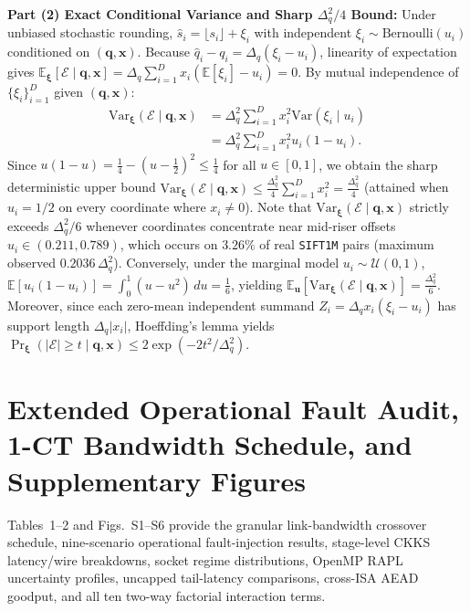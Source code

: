 \documentclass[10pt,journal,compsoc]{IEEEtran}
\begin{document}
\smallskip\noindent\textbf{Part (2) Exact Conditional Variance and Sharp $\Delta_q^2/4$ Bound:} Under unbiased stochastic rounding, $\widehat{s}_i = \lfloor s_i \rfloor + \xi_i$ with independent $\xi_i \sim \mathrm{Bernoulli}(u_i)$ conditioned on $(\mathbf{q},\mathbf{x})$. Because $\widehat{q}_i - q_i = \Delta_q(\xi_i - u_i)$, linearity of expectation gives $\mathbb{E}_{\boldsymbol{\xi}}[\mathcal{E}\mid\mathbf{q},\mathbf{x}] = \Delta_q \sum_{i=1}^D x_i (\mathbb{E}[\xi_i] - u_i) = 0$. By mutual independence of $\{\xi_i\}_{i=1}^D$ given $(\mathbf{q},\mathbf{x})$:
\begin{align}
\mathrm{Var}_{\boldsymbol{\xi}}(\mathcal{E} \mid \mathbf{q}, \mathbf{x}) &= \Delta_q^2 \sum_{i=1}^D x_i^2 \mathrm{Var}(\xi_i \mid u_i) \nonumber\\
&= \Delta_q^2 \sum_{i=1}^D x_i^2 u_i(1 - u_i).
\end{align}
Since $u(1-u) = \frac{1}{4} - (u - \frac{1}{2})^2 \le \frac{1}{4}$ for all $u \in [0,1]$, we obtain the sharp deterministic upper bound $\mathrm{Var}_{\boldsymbol{\xi}}(\mathcal{E}\mid\mathbf{q},\mathbf{x}) \le \frac{\Delta_q^2}{4}\sum_{i=1}^D x_i^2 = \frac{\Delta_q^2}{4}$ (attained when $u_i = 1/2$ on every coordinate where $x_i \neq 0$). Note that $\mathrm{Var}_{\boldsymbol{\xi}}(\mathcal{E}\mid\mathbf{q},\mathbf{x})$ strictly exceeds $\Delta_q^2/6$ whenever coordinates concentrate near mid-riser offsets $u_i \in (0.211, 0.789)$, which occurs on $3.26\%$ of real \texttt{SIFT1M} pairs (maximum observed $0.2036\,\Delta_q^2$). Conversely, under the marginal model $u_i \sim \mathcal{U}(0,1)$, $\mathbb{E}[u_i(1-u_i)] = \int_0^1 (u - u^2)\,du = \frac{1}{6}$, yielding $\mathbb{E}_{\mathbf{u}}[\mathrm{Var}_{\boldsymbol{\xi}}(\mathcal{E}\mid\mathbf{q},\mathbf{x})] = \frac{\Delta_q^2}{6}$. Moreover, since each zero-mean independent summand $Z_i = \Delta_q x_i(\xi_i - u_i)$ has support length $\Delta_q |x_i|$, Hoeffding's lemma yields $\Pr_{\boldsymbol{\xi}}(|\mathcal{E}| \ge t \mid \mathbf{q},\mathbf{x}) \le 2\exp(-2t^2/\Delta_q^2)$.

\section{Extended Operational Fault Audit, 1-CT Bandwidth Schedule, and Supplementary Figures}
Tables~1--2 and Figs.~S1--S6 provide the granular link-bandwidth crossover schedule, nine-scenario operational fault-injection results, stage-level CKKS latency/wire breakdowns, socket regime distributions, OpenMP RAPL uncertainty profiles, uncapped tail-latency comparisons, cross-ISA AEAD goodput, and all ten two-way factorial interaction terms.
\end{document}
